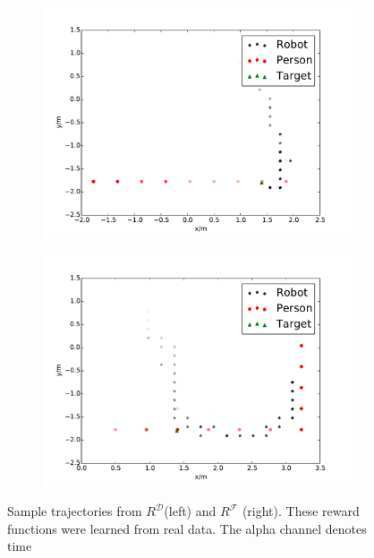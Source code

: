 \documentclass[letterpaper]{article}
\begin{document}
\begin{figure}[t]
  \hspace{-10pt}
  \begin{subfigure}{0.22\textwidth}
    \includegraphics[scale = 0.24]{images/good_path.pdf}
    \label{fig:good_path}
  \end{subfigure}
  \hspace{15pt}
  \begin{subfigure}{0.22\textwidth}
    \includegraphics[scale = 0.24]{images/bad_path.pdf}
    \label{fig:bad_path}
\end{subfigure}
  \caption{\small{Sample trajectories from $R^\mathcal{D}$(left) and $R^\mathcal{F}$ (right). These reward functions were learned from real data. The alpha channel denotes time}}
  \label{fig:paths}
\vspace{-4mm}
\end{figure}
\end{document}
